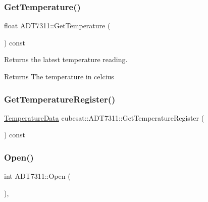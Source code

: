 \subsubsection{\texorpdfstring{Get\+Temperature()}{GetTemperature()}}
{\footnotesize\ttfamily float A\+D\+T7311\+::\+Get\+Temperature (\begin{DoxyParamCaption}{ }\end{DoxyParamCaption}) const}



Returns the latest temperature reading. 

\begin{DoxyReturn}{Returns}
The temperature in celcius 
\end{DoxyReturn}
\mbox{\label{classcubesat_1_1ADT7311_a84b567fb73e84dca956b9129a020f7ed}} 
\subsubsection{\texorpdfstring{Get\+Temperature\+Register()}{GetTemperatureRegister()}}
{\footnotesize\ttfamily \hyperlink{unioncubesat_1_1ADT7311_1_1TemperatureData}{Temperature\+Data} cubesat\+::\+A\+D\+T7311\+::\+Get\+Temperature\+Register (\begin{DoxyParamCaption}{ }\end{DoxyParamCaption}) const\hspace{0.3cm}{\ttfamily [inline]}}

\mbox{\label{classcubesat_1_1ADT7311_ac8ddceb62b008effe3f4521bbbe154f7}} 
\subsubsection{\texorpdfstring{Open()}{Open()}}
{\footnotesize\ttfamily int A\+D\+T7311\+::\+Open (\begin{DoxyParamCaption}{ }\end{DoxyParamCaption})\hspace{0.3cm}{\ttfamily [override]}, {\ttfamily [virtual]}}

